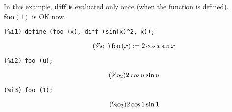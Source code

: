 \documentclass[12pt,leqno]{article}
\begin{document}
\begin{enumerate}
In this example, $\mathbf{diff}$ is evaluated only once (when the function is defined).
$\mathbf{foo} (1)$ is OK now.
\begin{verbatim}
(%i1) define (foo (x), diff (sin(x)^2, x));
\end{verbatim}
\begin{equation}
\tag{$\mathop{\mathrm{\%o}_{1}}$}\mathop{\mathrm{foo}}\left(x\right) := 2 \cos x \sin x
\label{eq:doc-group1-code27-1-1}
\end{equation}
\begin{verbatim}
(%i2) foo (u);
\end{verbatim}
\begin{equation}
\tag{$\mathop{\mathrm{\%o}_{2}}$}2 \cos u \sin u
\label{eq:doc-group1-code27-2-1}
\end{equation}
\begin{verbatim}
(%i3) foo (1);
\end{verbatim}
\begin{equation}
\tag{$\mathop{\mathrm{\%o}_{3}}$}2 \cos 1 \sin 1
\label{eq:doc-group1-code27-3-1}
\end{equation}


\end{enumerate}
\end{document}
